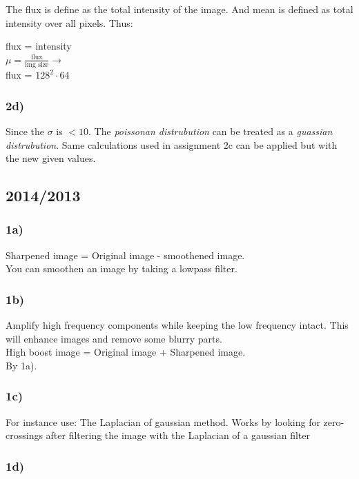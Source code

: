 \documentclass[12pt]{article}
\begin{document}
    The flux is define as the total intensity of the image. And mean is defined as total intensity over all pixels. Thus:
    
    flux = intensity\\
    $\mu = \frac{\text{flux}}{\text{img size}} \rightarrow $\\
    flux = $128^2 \cdot 64$
    
    \subsubsection*{2d)}
    Since the $\sigma$ is $< 10$. The \textit{poissonan distrubution} can be treated as a \textit{guassian distrubution}. Same calculations used in assignment 2c can be applied but with the new given values.
    
	\subsection{2014/2013}
	\subsubsection*{1a)}
	
	    Sharpened image = Original image - smoothened image.\\
	    You can smoothen an image by taking a lowpass filter. 
	
	\subsubsection*{1b)}
	
	    Amplify high frequency components while keeping the low frequency intact. This will enhance images and remove some blurry parts. \\
	    High boost image = Original image + Sharpened image. 
	    \\By 1a).
	
	\subsubsection*{1c)}
	
	    For instance use: The Laplacian of gaussian method. Works by looking for zero-crossings after filtering the image with the Laplacian of a gaussian filter
	
	\subsubsection*{1d)}
	
\end{document}
